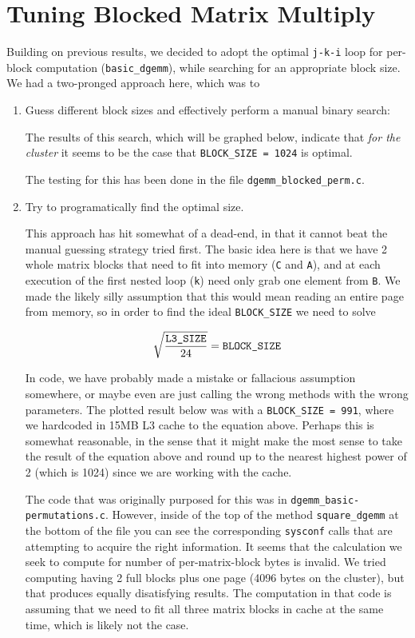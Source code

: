 \documentclass[11pt]{article}
\begin{document}
\section{Tuning Blocked Matrix Multiply}

Building on previous results, we decided to adopt the optimal \texttt{j-k-i} loop for per-block computation (\texttt{basic\_dgemm}), while searching for an appropriate block size.  We had a two-pronged approach here, which was to

\begin{enumerate}
    \item Guess different block sizes and effectively perform a manual binary search:

    The results of this search, which will be graphed below, indicate that \emph{for the cluster} it seems to be the case that \texttt{BLOCK\_SIZE = 1024} is optimal.

    The testing for this has been done in the file \texttt{dgemm\_blocked\_perm.c}.

    \item Try to programatically find the optimal size.

    This approach has hit somewhat of a dead-end, in that it cannot beat the manual guessing strategy tried first.  The basic idea here is that we have 2 whole matrix blocks that need to fit into memory (\texttt{C} and \texttt{A}), and at each execution of the first nested loop (\texttt{k}) need only grab one element from \texttt{B}.  We made the likely silly assumption that this would mean reading an entire page from memory, so in order to find the ideal \texttt{BLOCK\_SIZE} we need to solve

    $$
    \sqrt{\frac{\text{\ttfamily L3\_SIZE}}{24}} = \text{\ttfamily BLOCK\_SIZE}
    $$

    In code, we have probably made a mistake or fallacious assumption somewhere, or maybe even are just calling the wrong methods with the wrong parameters.  The plotted result below was with a \texttt{BLOCK\_SIZE = 991}, where we hardcoded in 15MB L3 cache to the equation above.  Perhaps this is somewhat reasonable, in the sense that it might make the most sense to take the result of the equation above and round up to the nearest highest power of 2 (which is 1024) since we are working with the cache.

    \noindent The code that was originally purposed for this was in \texttt{dgemm\_basic-permutations.c}.  However, inside of the top of the method \texttt{square\_dgemm} at the bottom of the file you can see the corresponding \texttt{sysconf} calls that are attempting to acquire the right information.  It seems that the calculation we seek to compute for number of per-matrix-block bytes is invalid.  We tried computing having 2 full blocks plus one page (4096 bytes on the cluster), but that produces equally disatisfying results.  The computation in that code is assuming that we need to fit all three matrix blocks in cache at the same time, which is likely not the case.
\end{enumerate}
\end{document}
